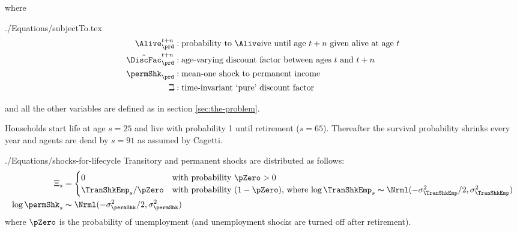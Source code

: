 \documentclass[\econtexRoot/SolvingMicroDSOPs]{subfiles}
\begin{document}
 \unskip
where
\begin{verbatimwrite}{./Equations/subjectTo.tex}
  \begin{equation*}\begin{gathered}\begin{aligned}
        \Alive _{\prd}^{t+n} &:\text{probability to }\Alive\text{ive until age $t+n$ given alive at age $t$}
        \\      \hat{\DiscFac}_{\prd}^{t+n} &:\text{age-varying discount factor between ages $t$ and $t+n$}
        \\     \permShk_{\prd} &:\text{mean-one shock to permanent income}
        \\     \beth &:\text{time-invariant `pure' discount factor}
      \end{aligned}\end{gathered}\end{equation*}
\end{verbatimwrite} 
\unskip
and all the other variables are defined as in section \ref{sec:the-problem}.

Households start life at age $s=25$ and live with probability 1 until retirement
($s=65$). Thereafter the survival probability shrinks every year and
agents are dead by $s=91$ as assumed by Cagetti. %

\begin{verbatimwrite}{./Equations/shocks-for-lifecycle}
  Transitory and permanent shocks are distributed as follows:
  \begin{equation}\begin{gathered}\begin{aligned}
        \Xi_{s} & =
        \begin{cases}
          0\phantom{/\pZero} & \text{with probability $\pZero>0$} \\
          \TranShkEmp_{s}/\pZero      & \text{with probability $(1-\pZero)$, where $\log \TranShkEmp_{s}\thicksim \Nrml(-\sigma_{\TranShkEmp}^{2}/2,\sigma_{\TranShkEmp}^{2})$}\\
        \end{cases}\\
        \log \permShk_{s} &\thicksim \Nrml(-\sigma_{\permShk}^{2}/2,\sigma_{\permShk}^{2})
      \end{aligned}\end{gathered}\end{equation}
  where $\pZero$ is the probability of unemployment (and unemployment shocks are turned off after retirement).
\end{verbatimwrite}
 \unskip
\end{document}
